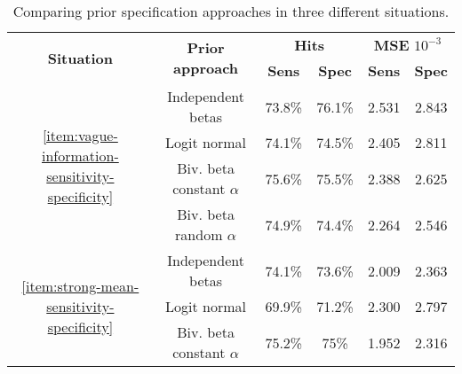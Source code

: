 \begin{table}[tbp]
  \centering
  \caption{\label{tab:comparison-prior-approach-sensitivity-specificity}Comparing
    prior specification approaches in three different situations.}
  \begin{tabular}{cccccc}
    \hline
    \multirow{2}{*}{\textbf{Situation}}                                                 & \multirow{2}{*}{\textbf{Prior
    approach}}                                                                          & \multicolumn{2}{c}{\textbf{Hits}} &
    \multicolumn{2}{c}{\textbf{MSE} $10^{-3}$}                                                                                                                                              \\ \cline{3-6}
                                                                                        &                                   & \textbf{Sens} & \textbf{Spec} & \textbf{Sens} & \textbf{Spec} \\ \hline
    \multirow{4}{*}{\autoref{item:vague-information-sensitivity-specificity}}           & Independent betas                 & 73.8\%        & 76.1\%        & 2.531         & 2.843         \\
                                                                                        & Logit normal                      & 74.1\%        & 74.5\%        & 2.405         & 2.811         \\
                                                                                        & Biv. beta constant $\alpha$       & 75.6\%        & 75.5\%        & 2.388         & 2.625         \\
                                                                                        & Biv. beta random $\alpha$         & 74.9\%        & 74.4\%        & 2.264         & 2.546         \\\hline
    \multirow{4}{*}{\autoref{item:strong-mean-sensitivity-specificity}}                 & Independent betas                 & 74.1\%        & 73.6\%        & 2.009         & 2.363         \\
                                                                                        & Logit normal                      & 69.9\%        & 71.2\%        & 2.300         & 2.797         \\
                                                                                        & Biv. beta constant $\alpha$       & 75.2\%        & 75\%          & 1.952         & 2.316         \\

\end{tabular}
\end{table}
